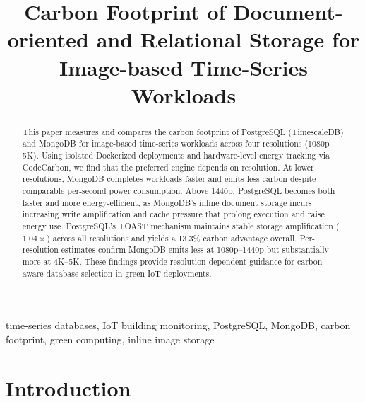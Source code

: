 \documentclass[conference]{IEEEtran}
\begin{document}
\title{Carbon Footprint of Document-oriented and Relational Storage for Image-based Time-Series Workloads}

\author{
}


\maketitle

\begin{abstract}
This paper measures and compares the carbon footprint of PostgreSQL (TimescaleDB) and MongoDB for image-based time-series workloads across four resolutions (1080p--5K). Using isolated Dockerized deployments and hardware-level energy tracking via CodeCarbon, we find that the preferred engine depends on resolution. At lower resolutions, MongoDB completes workloads faster and emits less carbon despite comparable per-second power consumption. Above 1440p, PostgreSQL becomes both faster and more energy-efficient, as MongoDB's inline document storage incurs increasing write amplification and cache pressure that prolong execution and raise energy use. PostgreSQL's TOAST mechanism maintains stable storage amplification ($1.04\times$) across all resolutions and yields a 13.3\% carbon advantage overall. Per-resolution estimates confirm MongoDB emits less at 1080p--1440p but substantially more at 4K--5K. These findings provide resolution-dependent guidance for carbon-aware database selection in green IoT deployments.
\end{abstract}

\begin{IEEEkeywords}
time-series databases, IoT building monitoring, PostgreSQL, MongoDB, carbon footprint, green computing, inline image storage
\end{IEEEkeywords}

\section{Introduction}
\label{sec:introduction}
\end{document}
